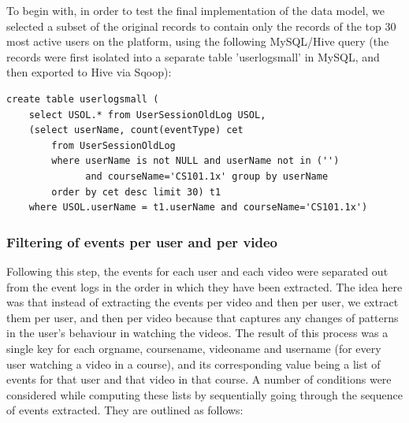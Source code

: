 \documentclass[16pt]{report}
\begin{document}
To begin with, in order to test the final implementation of the data model, we selected a subset of the original records to contain only the records of the top 30 most active users on the platform, using the following MySQL/Hive query (the records were first isolated into a separate table 'userlogsmall' in MySQL, and then exported to Hive via Sqoop):

\begin{verbatim}
create table userlogsmall (
    select USOL.* from UserSessionOldLog USOL, 
    (select userName, count(eventType) cet 
        from UserSessionOldLog 
        where userName is not NULL and userName not in ('') 
              and courseName='CS101.1x' group by userName 
        order by cet desc limit 30) t1 
    where USOL.userName = t1.userName and courseName='CS101.1x')
\end{verbatim}

\subsubsection{Filtering of events per user and per video}

Following this step, the events for each user and each video were separated out from the event logs in the order in which they have been extracted. The idea here was that instead of extracting the events per video and then per user, we extract them per user, and then per video because that captures any changes of patterns in the user's behaviour in watching the videos. The result of this process was a single key for each orgname, coursename, videoname and username (for every user watching a video in a course), and its corresponding value being a list of events for that user and that video in that course. A number of conditions were considered while computing these lists by sequentially going through the sequence of events extracted. They are outlined as follows:
\end{document}
